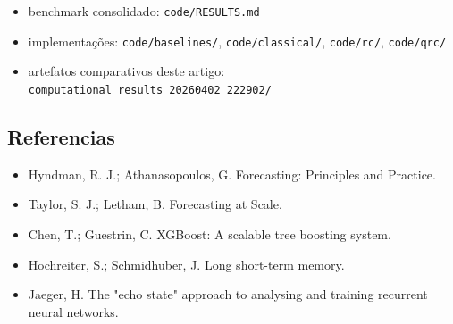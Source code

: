 \documentclass[12pt]{article}
\providecommand{\tightlist}{%
          \setlength{\itemsep}{0pt}\setlength{\parskip}{0pt}}
\begin{document}
\begin{itemize}
\tightlist
\item
  benchmark consolidado: \texttt{code/RESULTS.md}
\item
  implementações: \texttt{code/baselines/}, \texttt{code/classical/}, \texttt{code/rc/}, \texttt{code/qrc/}
\item
  artefatos comparativos deste artigo: \texttt{computational\_results\_20260402\_222902/}
\end{itemize}

\subsection{Referencias}\label{referencias}

\begin{itemize}
\tightlist
\item
  Hyndman, R. J.; Athanasopoulos, G. Forecasting: Principles and Practice.
\item
  Taylor, S. J.; Letham, B. Forecasting at Scale.
\item
  Chen, T.; Guestrin, C. XGBoost: A scalable tree boosting system.
\item
  Hochreiter, S.; Schmidhuber, J. Long short-term memory.
\item
  Jaeger, H. The "echo state" approach to analysing and training recurrent neural networks.
\end{itemize}

        
\end{document}
